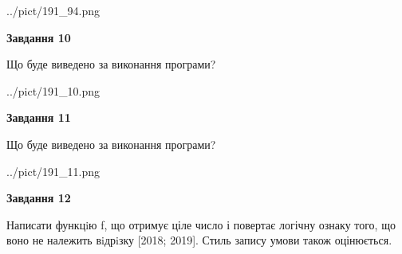 \documentclass[12pt, ukrainian]{article}
\begin{document}
{\begin {large}
\begin{center}
	{../pict/191_94.png}
\end{center}
\newpage

{\begin {center}\textbf{Завдання 10}\end {center}}

Що буде виведено за виконання програми?\par
\begin{center}
	{../pict/191_10.png}
\end{center}
\newpage

{\begin {center}\textbf{Завдання 11}\end {center}}

Що буде виведено за виконання програми?\par
\begin{center}
	{../pict/191_11.png}
\end{center}
\newpage

{\begin {center}\textbf{Завдання 12}\end {center}}


Написати функцiю f, що отримує ціле число і повертає логічну ознаку того, що воно не належить вiдрiзку [2018; 2019]. Стиль запису умови також оцінюється.\par
\newpage

\end {large}}
\end{document}
